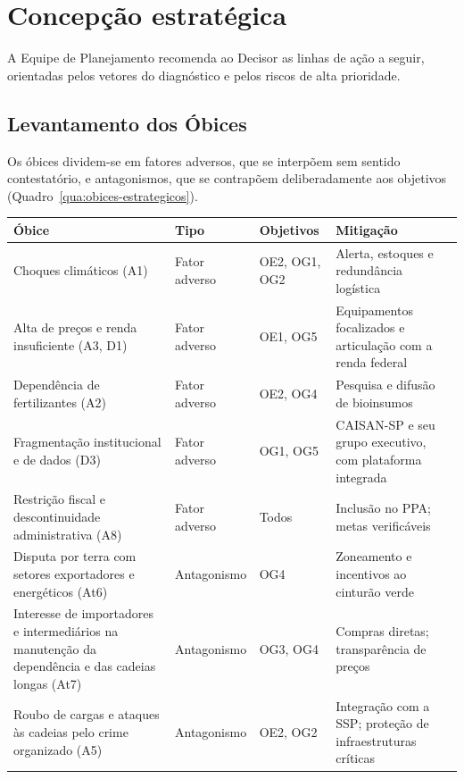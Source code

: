\documentclass[
	12pt,				%
	openright,			%
	oneside,			%
	a4paper,			%
	chapter=TITLE,		%
	section=TITLE,		%
	english,			%
	french,				%
	spanish,			%
	brazil,				%
 ]{abntex2}
\begin{document}
\section{Concepção estratégica}
A Equipe de Planejamento recomenda ao Decisor as linhas de ação a seguir,
orientadas pelos vetores do diagnóstico e pelos riscos de alta prioridade.

\subsection{Levantamento dos Óbices}
Os óbices dividem-se em fatores adversos, que se interpõem sem sentido
contestatório, e antagonismos, que se contrapõem deliberadamente aos objetivos
\cite[p. 42--43]{esg_fpn2024}
(Quadro~\ref{qua:obices-estrategicos}).

\begin{quadro}[!htbp]
\centering
\caption{Óbices à consecução dos objetivos}
\label{qua:obices-estrategicos}
\footnotesize
\renewcommand{\arraystretch}{1.05}
\setlength{\tabcolsep}{3pt}
\begin{tabularx}{\textwidth}{|>{\raggedright\arraybackslash}p{4.0cm}|>{\centering\arraybackslash}p{2.0cm}|>{\centering\arraybackslash}p{1.6cm}|>{\raggedright\arraybackslash}X|}
\hline
\textbf{Óbice} & \textbf{Tipo} & \textbf{Objetivos} & \textbf{Mitigação} \\
\hline
Choques climáticos (A1) & Fator adverso & OE2, OG1, OG2 & Alerta, estoques e redundância logística \\
\hline
Alta de preços e renda insuficiente (A3, D1) & Fator adverso & OE1, OG5 & Equipamentos focalizados e articulação com a renda federal \\
\hline
Dependência de fertilizantes (A2) & Fator adverso & OE2, OG4 & Pesquisa e difusão de bioinsumos \\
\hline
Fragmentação institucional e de dados (D3) & Fator adverso & OG1, OG5 & CAISAN-SP e seu grupo executivo, com plataforma integrada \\
\hline
Restrição fiscal e descontinuidade administrativa (A8) & Fator adverso & Todos & Inclusão no PPA; metas verificáveis \\
\hline
Disputa por terra com setores exportadores e energéticos (At6) & Antagonismo & OG4 & Zoneamento e incentivos ao cinturão verde \\
\hline
Interesse de importadores e intermediários na manutenção da dependência e das cadeias longas (At7) & Antagonismo & OG3, OG4 & Compras diretas; transparência de preços \\
\hline
Roubo de cargas e ataques às cadeias pelo crime organizado (A5) & Antagonismo & OE2, OG2 & Integração com a SSP; proteção de infraestruturas críticas \\
\hline
\end{tabularx}
\end{quadro}
\end{document}
